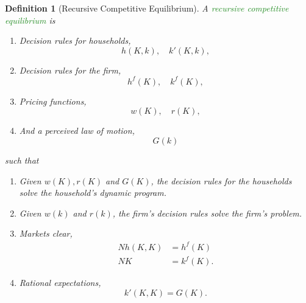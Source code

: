 \documentclass[11pt]{article}
\newtheorem*{definition}{Definition}
\newcommand{\gr}{\textcolor{ForestGreen}}
\begin{document}
\begin{definition}[Recursive Competitive Equilibrium]
A \gr{recursive competitive equilibrium} is 
\begin{enumerate}[label=(\alph*)]
\item Decision rules for households,
\[
h(K, k), \quad k'(K, k),
\]
\item Decision rules for the firm,
\[
h^f(K),\quad k^f(K),
\]
\item Pricing functions,
\[
w(K),\quad r(K),
\]
\item And a perceived law of motion,
\[
G(k)
\]
\end{enumerate}
such that
\begin{enumerate}
\item Given $w(K), r(K)$ and $G(K)$, the decision rules for the households solve the household's dynamic program.
\item Given $w(k)$ and $r(k)$, the firm's decision rules solve the firm's problem.
\item Markets clear,
\begin{align*}
Nh(K, K) &= h^f(K)\\
NK &= k^f(K).
\end{align*}
\item Rational expectations,
\[
k'(K, K) = G(K).
\]
\end{enumerate}
\end{definition}
\end{document}
